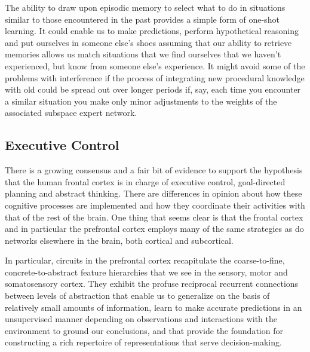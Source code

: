 \documentclass[letterpaper,11pt]{article}
\begin{document}
The ability to draw upon episodic memory to select what to do in situations similar to those encountered in the past provides a simple form of one-shot learning. It could enable us to make predictions, perform hypothetical reasoning and put ourselves in someone else's shoes assuming that our ability to retrieve memories allows us match situations that we find ourselves that we haven't experienced, but know from someone else's experience. It might avoid some of the problems with interference if the process of integrating new procedural knowledge with old could be spread out over longer periods if, say, each time you encounter a similar situation you make only minor adjustments to the weights of the associated subspace expert network. 



\subsection{Executive Control}
\label{subsection_executive_control}




There is a growing consensus and a fair bit of evidence to support the hypothesis that the human frontal cortex is in charge of executive control, goal-directed planning and abstract thinking. There are differences in opinion about how these cognitive processes are implemented and how they coordinate their activities with that of the rest of the brain. One thing that seems clear is that the frontal cortex and in particular the prefrontal cortex employs many of the same strategies as do networks elsewhere in the brain, both cortical and subcortical.

In particular, circuits in the prefrontal cortex recapitulate the coarse-to-fine, concrete-to-abstract feature hierarchies that we see in the sensory, motor and somatosensory cortex. They exhibit the profuse reciprocal recurrent connections between levels of abstraction that enable us to generalize on the basis of relatively small amounts of information, learn to make accurate predictions in an unsupervised manner depending on observations and interactions with the environment to ground our conclusions, and that provide the foundation for constructing a rich repertoire of representations that serve decision-making.
\end{document}
